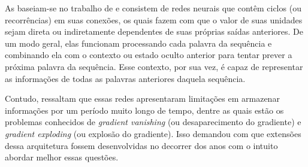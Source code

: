 
As  baseiam-se no trabalho de  e consistem de redes neurais que contêm ciclos (ou recorrências) em suas conexões, os quais fazem com que o valor de suas unidades sejam direta ou indiretamente dependentes de suas próprias saídas anteriores.
De um modo geral, elas funcionam processando cada palavra da sequência e combinando ela com o contexto ou estado oculto anterior para tentar prever a próxima palavra da sequência. Esse contexto, por sua vez, é capaz de representar as informações de todas as palavras anteriores daquela sequência.


Contudo,  ressaltam que essas redes apresentaram limitações em armazenar informações por um período muito longo de tempo, dentre as quais estão os problemas conhecidos de \textit{gradient vanishing} (ou desaparecimento do gradiente) e \textit{gradient exploding} (ou explosão do gradiente). Isso demandou com que extensões dessa arquitetura fossem desenvolvidas no decorrer dos anos com o intuito abordar melhor essas questões.


